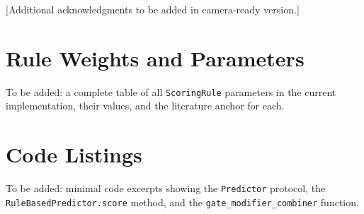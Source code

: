 \documentclass[11pt,a4paper]{article}
\begin{document}
[Additional acknowledgments to be added in camera-ready version.]



\appendix

\section{Rule Weights and Parameters}

To be added: a complete table of all \texttt{ScoringRule} parameters in the current implementation, their values, and the literature anchor for each.

\section{Code Listings}

To be added: minimal code excerpts showing the \texttt{Predictor} protocol, the \texttt{RuleBasedPredictor.score} method, and the \texttt{gate\_modifier\_combiner} function.
\end{document}
